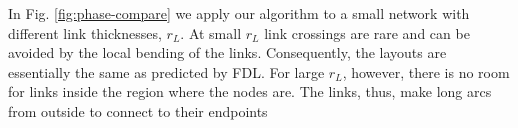 \documentclass[nofootinbib,preprint,floatfix,endfloats]{revtex4} %
\begin{document}
%
%
In Fig. \ref{fig:phase-compare} we apply our algorithm to a small %
network %
with different link thicknesses, $r_L$. At small $r_L$ link crossings are rare and can be avoided by the local bending of the links. Consequently, 
the layouts are essentially the same as predicted by FDL. For large $r_L$, however, there is no room for links inside the region where the nodes are. The links, thus, make long arcs from outside to connect to their endpoints
\end{document}
